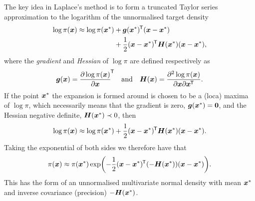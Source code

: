 The key idea in Laplace's method is to form a truncated Taylor series approximation to the logarithm of the unnormalised target density
\begin{equation}\label{eq:log-target-taylor-expansion}
\begin{split}
  \log\pi(\boldsymbol{x}) \approx 
  \log\pi(\boldsymbol{x}^*) 
  &+ \boldsymbol{g}(\boldsymbol{x}^*)^{\mkern-1.5mu\mathsf{T}}(\boldsymbol{x}-\boldsymbol{x}^*) \\
  &+ \frac{1}{2} (\boldsymbol{x}-\boldsymbol{x}^*)^{\mkern-1.5mu\mathsf{T}} \boldsymbol{H}(\boldsymbol{x}^*)(\boldsymbol{x}-\boldsymbol{x}^*),\\
\end{split}
\end{equation}
where the \emph{gradient} and \emph{Hessian} of $\log\pi$ are defined respectively as
\begin{equation}
  \boldsymbol{g}(\boldsymbol{x}) = \frac{\partial \log\pi(\boldsymbol{x})}{\partial \boldsymbol{x}}^{\mkern-1.5mu\mathsf{T}}
  \quad\textrm{and}\quad
  \boldsymbol{H}(\boldsymbol{x}) = \frac{\partial^2 \log\pi(\boldsymbol{x})}{\partial \boldsymbol{x} \partial \boldsymbol{x}^{\mkern-1.5mu\mathsf{T}}}.
\end{equation}
If the point $\boldsymbol{x}^*$ the expansion is formed around is chosen to be a (loca) maxima of $\log\pi$, which necessarily means that the gradient is zero, $\boldsymbol{g}(\boldsymbol{x}^*) = \boldsymbol{0}$, and the Hessian negative definite, $\boldsymbol{H}(\boldsymbol{x}^*) \prec 0$, then
\begin{equation}\label{eq:laplace-approximation-log}
  \log\pi(\boldsymbol{x}) \approx
  \log\pi(\boldsymbol{x}^*) + \frac{1}{2} (\boldsymbol{x}-\boldsymbol{x}^*)^{\mkern-1.5mu\mathsf{T}} \boldsymbol{H}(\boldsymbol{x}^*)(\boldsymbol{x}-\boldsymbol{x}^*).
\end{equation}
Taking the exponential of both sides we therefore have that
\begin{equation}\label{eq:laplace-approximation-exp}
  \pi(\vct{x}) \approx
  \pi(\vct{x}^*) \exp\lpa-\frac{1}{2} (\vct{x}-\vct{x}^*)\tr \lpa -\mtx{H}(\vct{x}^*)\rpa(\vct{x}-\vct{x}^*)\rpa.
\end{equation}
This has the form of an unnormalised multivariate normal density with mean $\boldsymbol{x}^*$ and inverse covariance (precision) $-\boldsymbol{H}(\boldsymbol{x}^*)$.

